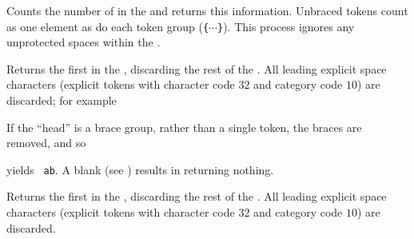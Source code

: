\documentclass[oneside]{book}
\begin{document}
\begin{function}{\TlVarCount}
\begin{syntax}
 
\end{syntax}
Counts the number of  in the  and returns this information.
Unbraced tokens count as one element as do each token group (\verb|{|$\cdots$\verb|}|).
This process ignores any unprotected spaces within the . %
\begin{demohigh}
\TlSet {}
\TlVarCount \lTmpaTl
\end{demohigh}
\end{function}

\begin{function}{\TlHead}
\begin{syntax}
 
\end{syntax}
Returns the first  in the ,
discarding the rest of the .
All leading explicit space characters
(explicit tokens with character code $32$ and category code $10$)
are discarded; for example
\begin{demohigh}
\end{demohigh}
If the \enquote{head} is a brace group, rather than a single token,
the braces are removed, and so
\begin{codehigh}
\end{codehigh}
yields \verb*| ab|.
A blank  (see ) results in
 returning nothing.
\end{function}

\begin{function}{\TlVarHead}
\begin{syntax}
 
\end{syntax}
Returns the first  in the ,
discarding the rest of the .
All leading explicit space characters (explicit tokens with character code $32$
and category code $10$) are discarded.
\begin{demohigh}
\TlSet {}
\TlVarHead \lTmpaTl
\end{demohigh}
\end{function}
\end{document}
